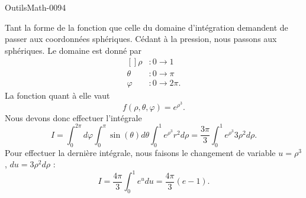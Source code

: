 
\begin{corrige}{OutilsMath-0094}

    Tant la forme de la fonction que celle du domaine d'intégration demandent de passer aux coordonnées sphériques. Cédant à la pression, nous passons aux sphériques. Le domaine est donné par
    \begin{equation}
        \begin{aligned}[]
            \rho&\colon 0\to 1\\
            \theta&\colon 0\to \pi\\
            \varphi&\colon 0\to 2\pi.
        \end{aligned}
    \end{equation} 
    La fonction quant à elle vaut
    \begin{equation}
        f(\rho,\theta,\varphi)= e^{\rho^{3}}.
    \end{equation}
    Nous devons donc effectuer l'intégrale
    \begin{equation}
        I=\int_0^{2\pi}d\varphi\int_0^{\pi}\sin(\theta)d\theta\int_0^1 e^{\rho^3}r^2d\rho=\frac{ 3\pi }{ 3 }\int_0^1 e^{\rho^3}3\rho^2d\rho.
    \end{equation}
    Pour effectuer la dernière intégrale, nous faisons le changement de variable $u=\rho^3$, $du=3\rho^2d\rho$ :
    \begin{equation}
        I=\frac{ 4\pi }{ 3 }\int_0^1 e^{u}du=\frac{ 4\pi }{ 3 }(e-1).
    \end{equation}

\end{corrige}
